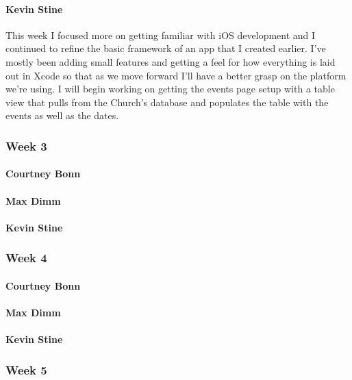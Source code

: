 \documentclass[letterpaper,10pt,draftclsnofoot,onecolumn,titlepage]{IEEEtran}
\begin{document}
			\paragraph{Kevin Stine}
			This week I focused more on getting familiar with iOS development and I continued to refine the basic framework of an app that I created earlier. I've mostly been adding small features and getting a feel for how everything is laid out in Xcode so that as we move forward I'll have a better grasp on the platform we're using. I will begin working on getting the events page setup with a table view that pulls from the Church's database and populates the table with the events as well as the dates.

		
		\subsubsection{Week 3}
		
			\paragraph{Courtney Bonn}

			\paragraph{Max Dimm}
			
			\paragraph{Kevin Stine}
			
		\subsubsection{Week 4}
		
			\paragraph{Courtney Bonn}

			\paragraph{Max Dimm}
			
			\paragraph{Kevin Stine}
			
		\subsubsection{Week 5}
		
\end{document}
